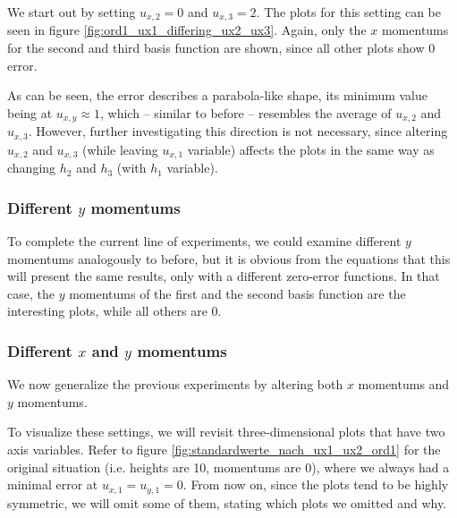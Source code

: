 \documentclass{article}
\begin{document}
We start out by setting $u_{x,2}=0$ and $u_{x,3}=2$. The plots for this setting can be seen in figure \ref{fig:ord1_ux1_differing_ux2_ux3}. Again, only the $x$ momentums for the second and third basis function are shown, since all other plots show 0 error.



As can be seen, the error describes a parabola-like shape, its minimum value being at $u_{x,y}\approx 1$, which -- similar to before -- resembles the average of $u_{x,2}$ and $u_{x,3}$. However, further investigating this direction is not necessary, since altering $u_{x,2}$ and $u_{x,3}$ (while leaving $u_{x,1}$ variable) affects the plots in the same way as changing $h_2$ and $h_3$ (with $h_1$ variable).

\subsubsection{\texorpdfstring{Different $y$ momentums}{Different y momentums}}
\label{sec:stiffness-analysis-ord1-nonstandard-diff-uy}

To complete the current line of experiments, we could examine different $y$ momentums analogously to before, but it is obvious from the equations that this will present the same results, only with a different zero-error functions. In that case, the $y$ momentums of the first and the second basis function are the interesting plots, while all others are 0.

\subsubsection{\texorpdfstring{Different $x$ and $y$ momentums}{Different x and y momentums}}
\label{sec:stiffness-analysis-different-ux-uy-momentums}

We now generalize the previous experiments by altering both $x$ momentums and $y$ momentums.



To visualize these settings, we will revisit three-dimensional plots that have two axis variables. Refer to figure \ref{fig:standardwerte_nach_ux1_ux2_ord1} for the original situation (i.e. heights are 10, momentums are 0), where we always had a minimal error at $u_{x,1}=u_{y,1}=0$. From now on, since the plots tend to be highly symmetric, we will omit some of them, stating which plots we omitted and why.
\end{document}
